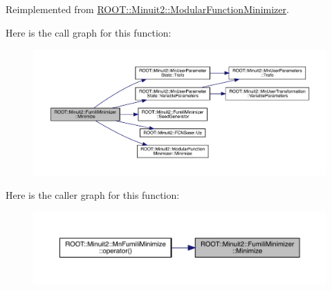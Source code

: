 Reimplemented from \mbox{\hyperlink{classROOT_1_1Minuit2_1_1ModularFunctionMinimizer_a1ae6ed90bc87c3db98388f3d26980a51}{R\+O\+O\+T\+::\+Minuit2\+::\+Modular\+Function\+Minimizer}}.

Here is the call graph for this function\+:
\nopagebreak
\begin{figure}[H]
\begin{center}
\leavevmode
\includegraphics[width=350pt]{db/da1/classROOT_1_1Minuit2_1_1FumiliMinimizer_a3da0ec7b2ba7f876809f72d2f3054eec_cgraph}
\end{center}
\end{figure}
Here is the caller graph for this function\+:
\nopagebreak
\begin{figure}[H]
\begin{center}
\leavevmode
\includegraphics[width=350pt]{db/da1/classROOT_1_1Minuit2_1_1FumiliMinimizer_a3da0ec7b2ba7f876809f72d2f3054eec_icgraph}
\end{center}
\end{figure}
\mbox{\label{classROOT_1_1Minuit2_1_1FumiliMinimizer_a3da0ec7b2ba7f876809f72d2f3054eec}} 
